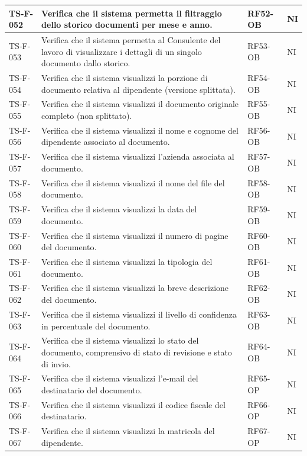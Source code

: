 \documentclass[a4paper,12pt]{article}
\begin{document}
\begin{longtable}{|p{2.2cm}|p{9.5cm}|p{2.3cm}|p{1.5cm}|}
    \hline
    TS-F-052 & Verifica che il sistema permetta il filtraggio dello storico documenti per mese e anno. & RF52-OB & NI \\
    \hline
    TS-F-053 & Verifica che il sistema permetta al Consulente del lavoro di visualizzare i dettagli di un singolo documento dallo storico. & RF53-OB & NI \\
    \hline
    TS-F-054 & Verifica che il sistema visualizzi la porzione di documento relativa al dipendente (versione splittata). & RF54-OB & NI \\
    \hline
    TS-F-055 & Verifica che il sistema visualizzi il documento originale completo (non splittato). & RF55-OB & NI \\
    \hline
    TS-F-056 & Verifica che il sistema visualizzi il nome e cognome del dipendente associato al documento. & RF56-OB & NI \\
    \hline
    TS-F-057 & Verifica che il sistema visualizzi l'azienda associata al documento. & RF57-OB & NI \\
    \hline
    TS-F-058 & Verifica che il sistema visualizzi il nome del file del documento. & RF58-OB & NI \\
    \hline
    TS-F-059 & Verifica che il sistema visualizzi la data del documento. & RF59-OB & NI \\
    \hline
    TS-F-060 & Verifica che il sistema visualizzi il numero di pagine del documento. & RF60-OB & NI \\
    \hline
    TS-F-061 & Verifica che il sistema visualizzi la tipologia del documento. & RF61-OB & NI \\
    \hline
    TS-F-062 & Verifica che il sistema visualizzi la breve descrizione del documento. & RF62-OB & NI \\
    \hline
    TS-F-063 & Verifica che il sistema visualizzi il livello di confidenza in percentuale del documento. & RF63-OB & NI \\
    \hline
    TS-F-064 & Verifica che il sistema visualizzi lo stato del documento, comprensivo di stato di revisione e stato di invio. & RF64-OB & NI \\
    \hline
    TS-F-065 & Verifica che il sistema visualizzi l'e-mail del destinatario del documento. & RF65-OP & NI \\
    \hline
    TS-F-066 & Verifica che il sistema visualizzi il codice fiscale del destinatario. & RF66-OP & NI \\
    \hline
    TS-F-067 & Verifica che il sistema visualizzi la matricola del dipendente. & RF67-OP & NI \\

\end{longtable}
\end{document}
